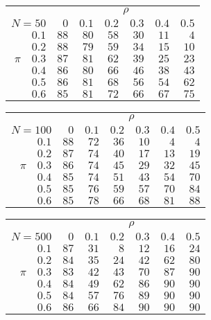 \begin{tabular}{r|rrrrrr}
\hline\hline
 &\multicolumn{6}{c}{$\rho$} \\ 
 $N = 50$ & $0$ & $0.1$ & $0.2$ & $0.3$ & $0.4$ & $0.5$ \\ 
 \hline$0.1$ & $88$ & $80$ & $58$ & $30$ & $11$ & $4$\\ 
$0.2$ & $88$ & $79$ & $59$ & $34$ & $15$ & $10$\\ 
$\pi\quad$$0.3$ & $87$ & $81$ & $62$ & $39$ & $25$ & $23$\\ 
$0.4$ & $86$ & $80$ & $66$ & $46$ & $38$ & $43$\\ 
$0.5$ & $86$ & $81$ & $68$ & $56$ & $54$ & $62$\\ 
$0.6$ & $85$ & $81$ & $72$ & $66$ & $67$ & $75$\\ 
 \hline 
 \end{tabular}
 
 \vspace{2em} 
 
\begin{tabular}{r|rrrrrr}
\hline\hline
 &\multicolumn{6}{c}{$\rho$} \\ 
 $N = 100$ & $0$ & $0.1$ & $0.2$ & $0.3$ & $0.4$ & $0.5$ \\ 
 \hline$0.1$ & $88$ & $72$ & $36$ & $10$ & $4$ & $4$\\ 
$0.2$ & $87$ & $74$ & $40$ & $17$ & $13$ & $19$\\ 
$\pi\quad$$0.3$ & $86$ & $74$ & $45$ & $29$ & $32$ & $45$\\ 
$0.4$ & $85$ & $74$ & $51$ & $43$ & $54$ & $70$\\ 
$0.5$ & $85$ & $76$ & $59$ & $57$ & $70$ & $84$\\ 
$0.6$ & $85$ & $78$ & $66$ & $68$ & $81$ & $88$\\ 
 \hline 
 \end{tabular}
 
 \vspace{2em} 
 
\begin{tabular}{r|rrrrrr}
\hline\hline
 &\multicolumn{6}{c}{$\rho$} \\ 
 $N = 500$ & $0$ & $0.1$ & $0.2$ & $0.3$ & $0.4$ & $0.5$ \\ 
 \hline$0.1$ & $87$ & $31$ & $8$ & $12$ & $16$ & $24$\\ 
$0.2$ & $84$ & $35$ & $24$ & $42$ & $62$ & $80$\\ 
$\pi\quad$$0.3$ & $83$ & $42$ & $43$ & $70$ & $87$ & $90$\\ 
$0.4$ & $84$ & $49$ & $62$ & $86$ & $90$ & $90$\\ 
$0.5$ & $84$ & $57$ & $76$ & $89$ & $90$ & $90$\\ 
$0.6$ & $86$ & $66$ & $84$ & $90$ & $90$ & $90$\\ 
 \hline 
 \end{tabular}